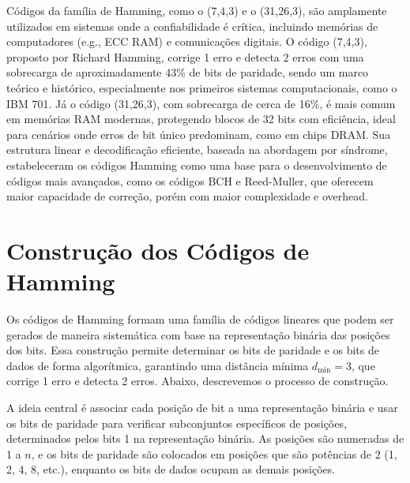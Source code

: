 Códigos da família de Hamming, como o (7,4,3) e o (31,26,3), são amplamente
utilizados em sistemas onde a confiabilidade é crítica, incluindo memórias de
computadores (e.g., ECC RAM) e comunicações digitais. O código (7,4,3),
proposto por Richard Hamming, corrige 1 erro e detecta 2 erros com uma
sobrecarga de aproximadamente 43\% de bits de paridade, sendo um marco teórico
e histórico, especialmente nos primeiros sistemas computacionais, como o IBM 701. Já o código
(31,26,3), com sobrecarga de cerca de 16\%, é mais comum em memórias RAM
modernas, protegendo blocos de 32 bits com eficiência, ideal para cenários onde
erros de bit único predominam, como em chips DRAM. Sua estrutura linear e
decodificação eficiente, baseada na abordagem por síndrome, estabeleceram os
códigos Hamming como uma base para o desenvolvimento de códigos mais avançados,
como os códigos BCH e Reed-Muller, que oferecem maior capacidade de correção,
porém com maior complexidade e overhead.






\section{Construção dos Códigos de Hamming}

Os códigos de Hamming formam uma família de códigos lineares que podem ser
gerados de maneira sistemática com base na representação binária das posições
dos bits. Essa construção permite determinar os bits de paridade e os bits de
dados de forma algorítmica, garantindo uma distância mínima $d_{\text{min}} = 3$, que
corrige 1 erro e detecta 2 erros. Abaixo, descrevemos o processo de construção.

A ideia central é associar cada posição de bit a uma representação binária e
usar os bits de paridade para verificar subconjuntos específicos de posições,
determinados pelos bits 1 na representação binária. As posições são numeradas
de 1 a $n$, e os bits de paridade são colocados em posições que são
potências de 2 (1, 2, 4, 8, etc.), enquanto os bits de dados ocupam as demais
posições.

